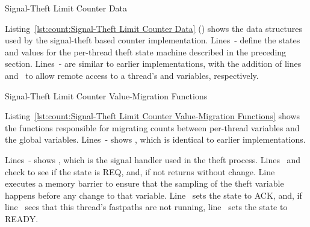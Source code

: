 \begin{listing}[tbp]

\caption{Signal-Theft Limit Counter Data}
\label{lst:count:Signal-Theft Limit Counter Data}
\end{listing}

\noindent%
\begin{lineref}
Listing~\ref{lst:count:Signal-Theft Limit Counter Data}
()
shows the data structures used by the signal-theft based counter
implementation.
Lines~- define the states and values
for the per-thread theft state machine
described in the preceding section.
Lines~- are similar to earlier implementations,
with the addition of
lines~ and~ to allow remote access to a
thread's 
and  variables, respectively.
\end{lineref}

\begin{listing}[tbp]

\caption{Signal-Theft Limit Counter Value-Migration Functions}
\label{lst:count:Signal-Theft Limit Counter Value-Migration Functions}
\end{listing}

\begin{lineref}
Listing~\ref{lst:count:Signal-Theft Limit Counter Value-Migration Functions}
shows the functions responsible for migrating counts between per-thread
variables and the global variables.
Lines~- shows ,
which is identical to earlier
implementations.
\end{lineref}
\begin{lineref}
Lines~- shows ,
which is the signal
handler used in the theft process.
Lines~ and~ check to see if
the  state is REQ, and, if not
returns without change.
Line~ executes a memory barrier to ensure that the sampling of the
theft variable happens before any change to that variable.
Line~ sets the  state to ACK, and, if
line~ sees that
this thread's fastpaths are not running, line~ sets the 
state to READY.
\end{lineref}

